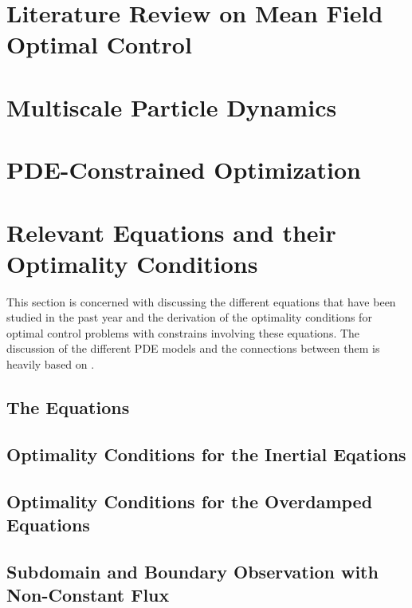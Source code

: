 \documentclass[11pt, a4paper]{article}
\theoremstyle{definition}
\begin{document}
\section{Literature Review on Mean Field Optimal Control}



\section{Multiscale Particle Dynamics}

	

\section{PDE-Constrained Optimization} 



\section{Relevant Equations and their Optimality Conditions}
This section is concerned with discussing the different equations that have been studied in the past year and the derivation of the optimality conditions for optimal control problems with constrains involving these equations. The discussion of the different PDE models and the connections between them is heavily based on \cite{Archer1}.

\subsection{The Equations}




\subsection{Optimality Conditions for the Inertial Eqations} \label{sec:INOptimalityConditions}




\subsection{Optimality Conditions for the Overdamped Equations}	

	

\subsection{Subdomain and Boundary Observation with Non-Constant Flux}
\end{document}
